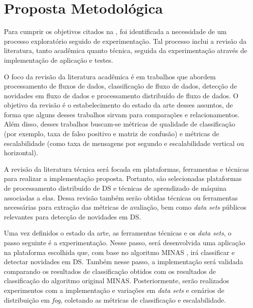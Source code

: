 
\section{Proposta Metodológica}


Para cumprir os objetivos citados na , foi identificada a necessidade
de um processo exploratório seguido de experimentação. Tal processo inclui a
revisão da literatura, tanto acadêmica quanto técnica, seguida da experimentação
através de implementação de aplicação e testes.

O foco da revisão da literatura acadêmica é em trabalhos que abordem
processamento de fluxos de dados, classificação de fluxo de dados, detecção de
novidades em fluxo de dados e processamento distribuído de fluxo de dados.
O objetivo da revisão é o estabelecimento do estado da arte desses assuntos,
de forma que alguns desses trabalhos sirvam para comparações e relacionamentos.
Além disso, desses trabalhos buscam-se métricas de qualidade de classificação
(por exemplo, taxa de falso positivo e matriz de confusão) e métricas de
escalabilidade (como taxa de mensagens por segundo e escalabilidade vertical ou
horizontal).

A revisão da literatura técnica será focada em plataformas, ferramentas e técnicas
para realizar a implementação proposta.
Portanto, são selecionadas plataformas de processamento distribuído de DS
e técnicas de aprendizado de máquina associadas a elas.
Dessa revisão também serão obtidas técnicas ou ferramentas necessárias
para extração das métricas de avaliação, bem como \emph{data sets}
públicos relevantes para detecção de novidades em DS.

Uma vez definidos o estado da arte, as ferramentas técnicas e os
\emph{data sets}, o passo seguinte é a experimentação.
Nesse passo, será desenvolvida uma aplicação na plataforma escolhida que, com base no
algoritmo MINAS \cite{Faria2015minas}, irá classificar e detectar novidades em DS.
Também nesse passo, a implementação será validada comparando os resultados de
classificação obtidos com os resultados de classificação do algoritmo original
MINAS.
Posteriormente, serão realizados experimentos com a implementação e variações em \emph{data sets} e
cenários de distribuição em \emph{fog}, coletando as métricas de classificação e escalabilidade.

